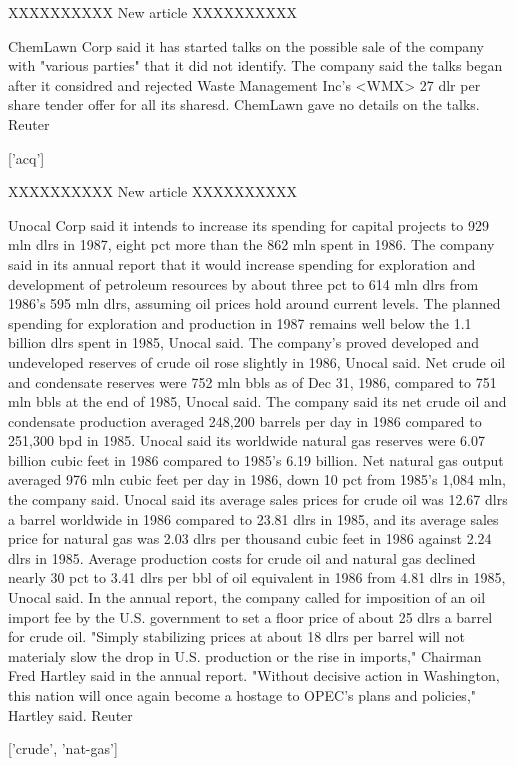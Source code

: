 \documentclass{article}
\begin{document}
\begin{pythonOutput}
['earn']

XXXXXXXXXX
New article
XXXXXXXXXX

ChemLawn Corp said it has
started talks on the possible sale of the company with "various
parties" that it did not identify.
    The company said the talks began after it considred and
rejected Waste Management Inc's <WMX> 27 dlr per share tender
offer for all its sharesd.
    ChemLawn gave no details on the talks.
 Reuter

['acq']

XXXXXXXXXX
New article
XXXXXXXXXX

Unocal Corp said it intends to
increase its spending for capital projects to 929 mln dlrs in
1987, eight pct more than the 862 mln spent in 1986.
    The company said in its annual report that it would
increase spending for exploration and development of petroleum
resources by about three pct to 614 mln dlrs from 1986's 595
mln dlrs, assuming oil prices hold around current levels.
    The planned spending for exploration and production in 1987
remains well below the 1.1 billion dlrs spent in 1985, Unocal
said.
    The company's proved developed and undeveloped reserves of
crude oil rose slightly in 1986, Unocal said. Net crude oil and
condensate reserves were 752 mln bbls as of Dec 31, 1986,
compared to 751 mln bbls at the end of 1985, Unocal said.
    The company said its net crude oil and condensate
production averaged 248,200 barrels per day in 1986 compared to
251,300 bpd in 1985.
    Unocal said its worldwide natural gas reserves were 6.07
billion cubic feet in 1986 compared to 1985's 6.19 billion. Net
natural gas output averaged 976 mln cubic feet per day in 1986,
down 10 pct from 1985's 1,084 mln, the company said.
    Unocal said its average sales prices for crude oil was
12.67 dlrs a barrel worldwide in 1986 compared to 23.81 dlrs in
1985, and its average sales price for natural gas was 2.03 dlrs
per thousand cubic feet in 1986 against 2.24 dlrs in 1985.
    Average production costs for crude oil and natural gas
declined nearly 30 pct to 3.41 dlrs per bbl of oil equivalent
in 1986 from 4.81 dlrs in 1985, Unocal said.
    In the annual report, the company called for imposition of
an oil import fee by the U.S. government to set a floor price
of about 25 dlrs a barrel for crude oil.
    "Simply stabilizing prices at about 18 dlrs per barrel    
will not materialy slow the drop in U.S. production or the rise
in imports," Chairman Fred Hartley said in the annual report.
    "Without decisive action in Washington, this nation will
once again become a hostage to OPEC's plans and policies,"
Hartley said.
 Reuter

['crude', 'nat-gas']


\end{pythonOutput}
\end{document}

